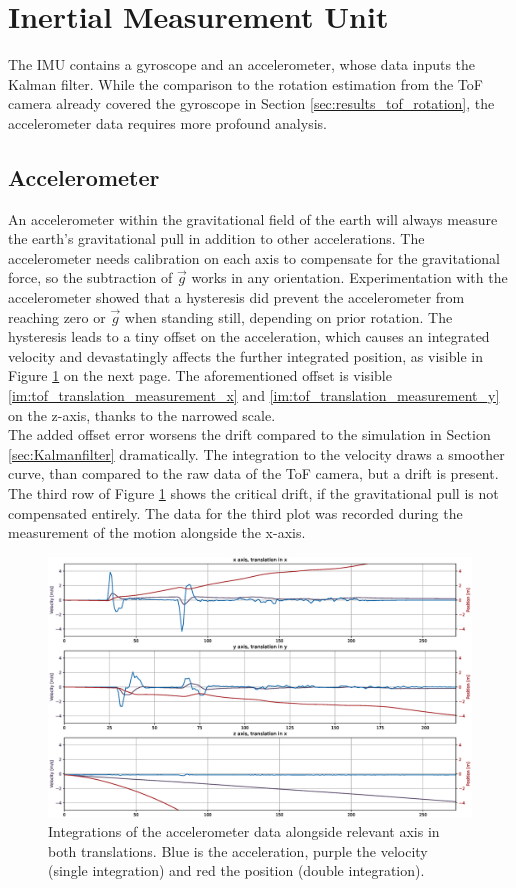 \section{Inertial Measurement Unit}
\label{sec:IMU_results}
The IMU contains a gyroscope and an accelerometer, whose data inputs the Kalman filter. While the comparison to the rotation estimation from the ToF camera already covered the gyroscope in Section \ref{sec:results_tof_rotation}, the accelerometer data requires more profound analysis.
\subsection{Accelerometer}
\label{sec:accel_results}
An accelerometer within the gravitational field of the earth will always measure the earth's gravitational pull in addition to other accelerations. The accelerometer needs calibration on each axis to compensate for the gravitational force, so the subtraction of $\vec{g}$ works in any orientation. Experimentation with the accelerometer showed that a hysteresis did prevent the accelerometer from reaching zero or $\vec{g}$ when standing still, depending on prior rotation. The hysteresis leads to a tiny offset on the acceleration, which causes an integrated velocity and devastatingly affects the further integrated position, as visible in Figure \ref{im:accelometer_integrated} on the next page. The aforementioned offset is visible \ref{im:tof_translation_measurement_x} and \ref{im:tof_translation_measurement_y} on the z-axis, thanks to the narrowed scale.\\
The added offset error worsens the drift compared to the simulation in Section \ref{sec:Kalmanfilter} dramatically. The integration to the velocity draws a smoother curve, than compared to the raw data of the ToF camera, but a drift is present. The third row of Figure \ref{im:accelometer_integrated} shows the critical drift, if the gravitational pull is not compensated entirely. The data for the third plot was recorded during the measurement of the motion alongside the x-axis.
\begin{figure}[H]
  \centering
  \includegraphics[width=1.0\textwidth]{images/accelerometer_translation_drift.eps}
  \caption{Integrations of the accelerometer data alongside relevant axis in both translations. Blue is the acceleration, purple the velocity (single integration) and red the position (double integration).}
  \label{im:accelometer_integrated}
\end{figure} 
